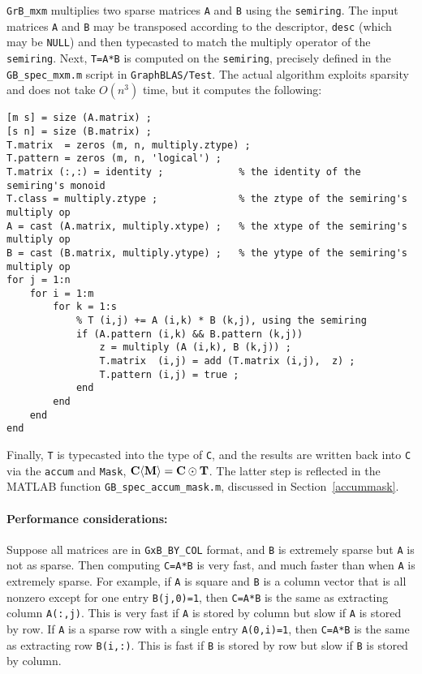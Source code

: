 \documentclass[12pt]{article}
\begin{document}
\verb'GrB_mxm' multiplies two sparse matrices \verb'A' and \verb'B' using the
\verb'semiring'.  The input matrices \verb'A' and \verb'B' may be transposed
according to the descriptor, \verb'desc' (which may be \verb'NULL') and then
typecasted to match the multiply operator of the \verb'semiring'.  Next,
\verb'T=A*B' is computed on the \verb'semiring', precisely defined in the
\verb'GB_spec_mxm.m' script in \verb'GraphBLAS/Test'.  The actual algorithm
exploits sparsity and does not take $O(n^3)$ time, but it computes the
following:

{\footnotesize
\begin{verbatim}
[m s] = size (A.matrix) ;
[s n] = size (B.matrix) ;
T.matrix  = zeros (m, n, multiply.ztype) ;
T.pattern = zeros (m, n, 'logical') ;
T.matrix (:,:) = identity ;             % the identity of the semiring's monoid
T.class = multiply.ztype ;              % the ztype of the semiring's multiply op
A = cast (A.matrix, multiply.xtype) ;   % the xtype of the semiring's multiply op
B = cast (B.matrix, multiply.ytype) ;   % the ytype of the semiring's multiply op
for j = 1:n
    for i = 1:m
        for k = 1:s
            % T (i,j) += A (i,k) * B (k,j), using the semiring
            if (A.pattern (i,k) && B.pattern (k,j))
                z = multiply (A (i,k), B (k,j)) ;
                T.matrix  (i,j) = add (T.matrix (i,j),  z) ;
                T.pattern (i,j) = true ;
            end
        end
    end
end \end{verbatim}}

Finally, \verb'T' is typecasted into the type of \verb'C', and the results are
written back into \verb'C' via the \verb'accum' and \verb'Mask', ${\bf C
\langle M \rangle  = C \odot T}$.  The latter step is reflected in the MATLAB
function \verb'GB_spec_accum_mask.m', discussed in Section~\ref{accummask}.

\paragraph{\bf Performance considerations:}
Suppose all matrices are in \verb'GxB_BY_COL' format, and \verb'B' is extremely
sparse but \verb'A' is not as sparse.  Then computing \verb'C=A*B' is very
fast, and much faster than when \verb'A' is extremely sparse.  For example, if
\verb'A' is square and \verb'B' is a column vector that is all nonzero except
for one entry \verb'B(j,0)=1', then \verb'C=A*B' is the same as extracting
column \verb'A(:,j)'.  This is very fast if \verb'A' is stored by column but
slow if \verb'A' is stored by row.  If \verb'A' is a sparse row with a single
entry \verb'A(0,i)=1', then \verb'C=A*B' is the same as extracting row
\verb'B(i,:)'.  This is fast if \verb'B' is stored by row but slow if \verb'B'
is stored by column.
\end{document}
